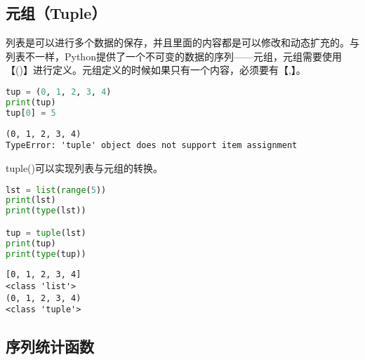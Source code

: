 \subsection{元组（Tuple）}

列表是可以进行多个数据的保存，并且里面的内容都是可以修改和动态扩充的。与列表不一样，Python提供了一个不可变的数据的序列——元组，元组需要使用【()】进行定义。元组定义的时候如果只有一个内容，必须要有【,】。\\


\begin{lstlisting}[language=Python]
tup = (0, 1, 2, 3, 4)
print(tup)
tup[0] = 5
\end{lstlisting}

\begin{tcolorbox}
	\begin{verbatim}
(0, 1, 2, 3, 4)
TypeError: 'tuple' object does not support item assignment
\end{verbatim}
\end{tcolorbox}

tuple()可以实现列表与元组的转换。\\


\begin{lstlisting}[language=Python]
lst = list(range(5))
print(lst)
print(type(lst))

tup = tuple(lst)
print(tup)
print(type(tup))
\end{lstlisting}

\begin{tcolorbox}
	\begin{verbatim}
[0, 1, 2, 3, 4]
<class 'list'>
(0, 1, 2, 3, 4)
<class 'tuple'>
\end{verbatim}
\end{tcolorbox}

\vspace{0.5cm}

\subsection{序列统计函数}

